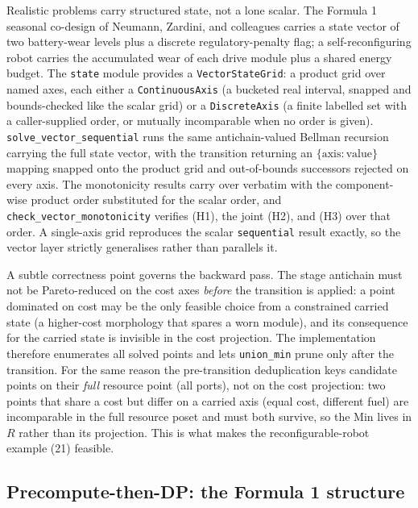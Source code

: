 \documentclass[11pt,a4paper]{article}
\begin{document}
Realistic problems carry structured state, not a lone scalar. The Formula 1
seasonal co-design of Neumann, Zardini, and colleagues
\citep{neumann2025formula1} carries a
state vector of two battery-wear levels plus a discrete regulatory-penalty
flag; a self-reconfiguring robot carries the accumulated wear of each drive
module plus a shared energy budget. The \texttt{state} module provides a
\texttt{VectorStateGrid}: a product grid over named axes, each either a
\texttt{ContinuousAxis} (a bucketed real interval, snapped and
bounds-checked like the scalar grid) or a \texttt{DiscreteAxis} (a finite
labelled set with a caller-supplied order, or mutually incomparable when no
order is given). \texttt{solve\_vector\_sequential} runs the same
antichain-valued Bellman recursion carrying the full state vector, with the
transition returning an $\{\text{axis} : \text{value}\}$ mapping snapped
onto the product grid and out-of-bounds successors rejected on every axis.
The monotonicity results carry over verbatim with the component-wise
product order substituted for the scalar order, and
\texttt{check\_vector\_monotonicity} verifies (H1), the joint (H2), and (H3)
over that order. A
single-axis grid reproduces the scalar \texttt{sequential} result exactly,
so the vector layer strictly generalises rather than parallels it.

A subtle correctness point governs the backward pass. The stage antichain
must not be Pareto-reduced on the cost axes \emph{before} the transition is
applied: a point dominated on cost may be the only feasible choice from a
constrained carried state (a higher-cost morphology that spares a worn
module), and its consequence for the carried state is invisible in the
cost projection. The implementation therefore enumerates all solved points
and lets \texttt{union\_min} prune only after the transition. For the same
reason the pre-transition deduplication keys candidate points on their
\emph{full} resource point (all ports), not on the cost projection: two
points that share a cost but differ on a carried axis (equal cost, different
fuel) are incomparable in the full resource poset and must both survive, so
the $\mathrm{Min}$ lives in $R$ rather than its projection. This is what
makes the reconfigurable-robot example (21) feasible.

\subsection{Precompute-then-DP: the Formula 1 structure}
\label{sec:precompute}
\end{document}
